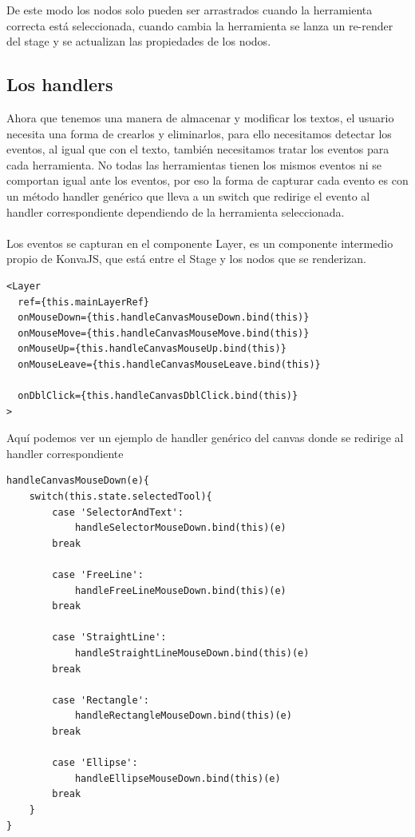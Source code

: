 De este modo los nodos solo pueden ser arrastrados cuando la herramienta correcta está
seleccionada, cuando cambia la herramienta se lanza un re-render del stage y se actualizan
las propiedades de los nodos.

\newpage
\subsection{Los handlers}

Ahora que tenemos una manera de almacenar y modificar los textos, 
el usuario necesita una forma de crearlos y eliminarlos, para ello necesitamos 
detectar los eventos, al igual que con el texto, también necesitamos tratar los eventos
para cada herramienta.
No todas las herramientas tienen los mismos eventos ni se comportan igual ante los eventos,
por eso la forma de capturar cada evento es con un método handler genérico que lleva a un 
switch que redirige el evento al handler correspondiente dependiendo de la herramienta seleccionada.
\\\\
Los eventos se capturan en el componente Layer, es un componente intermedio propio de KonvaJS\cite{KonvaJS},
que está entre el Stage y los nodos que se renderizan.

\begin{lstlisting}[caption={Enlazado de los handlers al componente layer que captura los eventos}]
<Layer
  ref={this.mainLayerRef}
  onMouseDown={this.handleCanvasMouseDown.bind(this)}
  onMouseMove={this.handleCanvasMouseMove.bind(this)}
  onMouseUp={this.handleCanvasMouseUp.bind(this)}
  onMouseLeave={this.handleCanvasMouseLeave.bind(this)}

  onDblClick={this.handleCanvasDblClick.bind(this)}
>
\end{lstlisting}

Aquí podemos ver un ejemplo de handler genérico del canvas donde se redirige al handler correspondiente

\begin{lstlisting}[caption={Sobrecarga del reescalado del nodo CvText}]
  handleCanvasMouseDown(e){
    switch(this.state.selectedTool){
        case 'SelectorAndText': 
            handleSelectorMouseDown.bind(this)(e)
        break

        case 'FreeLine':
            handleFreeLineMouseDown.bind(this)(e)
        break

        case 'StraightLine':
            handleStraightLineMouseDown.bind(this)(e)
        break

        case 'Rectangle':
            handleRectangleMouseDown.bind(this)(e)
        break

        case 'Ellipse':
            handleEllipseMouseDown.bind(this)(e)
        break
    }
}
\end{lstlisting}

